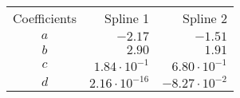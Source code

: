 \begin{tabular}{crr}
    \toprule
    Coefficients & Spline 1 & Spline 2 \\ \otoprule
    $a$ & $-2.17$ & $-1.51$ \\
    $b$ & $2.90$ & $1.91$ \\
    $c$ & $1.84 \cdot 10^{-1}$ & $6.80 \cdot 10^{-1}$ \\
    $d$ & $2.16 \cdot 10^{-16}$ & $-8.27 \cdot 10^{-2}$ \\
    \bottomrule
\end{tabular}
